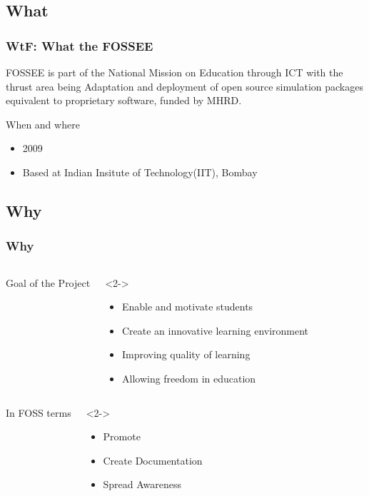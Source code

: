 \documentclass[compress,red]{beamer} %
\begin{document}
\subsection{What}
\begin{frame}
\frametitle{WtF: What the FOSSEE}
\begin{block}{FOSSEE}
is  part of the National Mission on Education through ICT with the thrust area being \alert{Adaptation and deployment of open source simulation packages equivalent to proprietary software}, funded by MHRD.
\end{block}
\begin{block}{When and where}
\begin{itemize}
\item 2009
\item Based at Indian Insitute of Technology(IIT), Bombay 
\end{itemize}
\end{block}
\end{frame}

\subsection{Why}
\begin{frame}
\frametitle{Why}
\begin{columns}
\begin{exampleblock}{}
Goal of the Project
\end{exampleblock}
\begin{exampleblock}<2->{}
\begin{itemize}
\item Enable and motivate students
\item Create an innovative learning environment
\item Improving quality of learning
\item Allowing freedom in education
\end{itemize}
\end{exampleblock}
\end{columns}
\end{frame}

\begin{frame}
\begin{columns}
\begin{exampleblock}{}
In FOSS terms
\end{exampleblock}
\begin{exampleblock}<2->{}
\begin{itemize}
\item Promote 
\item Create Documentation
\item Spread Awareness
\end{itemize}
\end{exampleblock}
\end{columns}
\end{frame}
\end{document}
